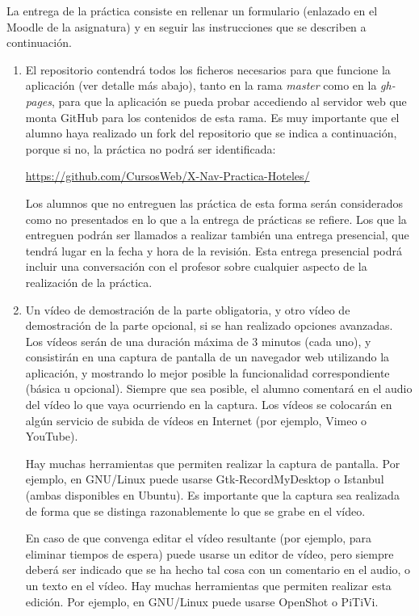 La entrega de la práctica consiste en rellenar un formulario (enlazado en el Moodle de la asignatura) y en seguir las instrucciones que se describen a continuación.

\begin{enumerate}
  \item El repositorio contendrá todos los ficheros necesarios para que funcione la aplicación (ver detalle más abajo), tanto en la rama \emph{master} como en la \emph{gh-pages}, para que la aplicación se pueda probar accediendo al servidor web que monta GitHub para los contenidos de esta rama. Es muy importante que el alumno haya realizado un fork del repositorio que se indica a continuación, porque si no, la práctica no podrá ser identificada: 

\url{https://github.com/CursosWeb/X-Nav-Practica-Hoteles/}

Los alumnos que no entreguen las práctica de esta forma serán considerados como no presentados en lo que a la entrega de prácticas se refiere. Los que la entreguen podrán ser llamados a realizar también una entrega presencial, que tendrá lugar en la fecha y hora de la revisión. Esta entrega presencial podrá incluir una conversación con el profesor sobre cualquier aspecto de la realización de la práctica.

 \item Un vídeo de demostración de la parte obligatoria, y otro vídeo de demostración de la parte opcional, si se han realizado opciones avanzadas. Los vídeos serán de una duración máxima de 3 minutos (cada uno), y consistirán en una captura de pantalla de un navegador web utilizando la aplicación, y mostrando lo mejor posible la funcionalidad correspondiente (básica u opcional). Siempre que sea posible, el alumno comentará en el audio del vídeo lo que vaya ocurriendo en la captura. Los vídeos se colocarán en algún servicio de subida de vídeos en Internet (por ejemplo, Vimeo o YouTube).

Hay muchas herramientas que permiten realizar la captura de pantalla. Por ejemplo, en GNU/Linux puede usarse Gtk-RecordMyDesktop o Istanbul (ambas disponibles en Ubuntu). Es importante que la captura sea realizada de forma que se distinga razonablemente lo que se grabe en el vídeo.

En caso de que convenga editar el vídeo resultante (por ejemplo, para eliminar tiempos de espera) puede usarse un editor de vídeo, pero siempre deberá ser indicado que se ha hecho tal cosa con un comentario en el audio, o un texto en el vídeo. Hay muchas herramientas que permiten realizar esta edición. Por ejemplo, en GNU/Linux puede usarse OpenShot o PiTiVi.


\end{enumerate}
